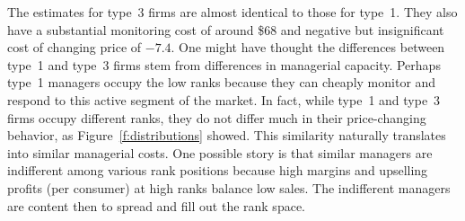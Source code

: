 \documentclass[11pt]{article}
\begin{document}
\begin{spacing}{1.3}
The estimates for type~3 firms are almost identical to those for
type~1. They also have a substantial monitoring cost of around \$68
and negative but insignificant cost of changing price of $-7.4$. One
might have thought the differences between type~1 and type~3 firms
stem from differences in managerial capacity. Perhaps type~1 managers
occupy the low ranks because they can cheaply monitor and respond to
this active segment of the market. In fact, while type~1 and type~3
firms occupy different ranks, they do not differ much in their
price-changing behavior, as Figure~\ref{f:distributions} showed. This
similarity naturally translates into similar managerial costs. One
possible story is that similar managers are indifferent among various
rank positions because high margins and upselling profits (per
consumer) at high ranks balance low sales. The indifferent managers
are content then to spread and fill out the rank space.


\end{spacing}
\end{document}
